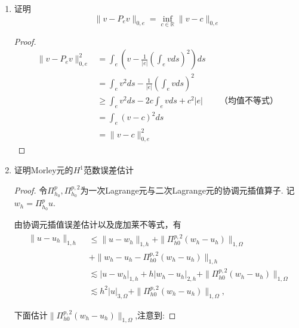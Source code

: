 \documentclass[12pt,a4paper]{article}
\begin{document}
\begin{enumerate}
\begin{proof}
			注意到最小特征值$\lambda = \frac{\pi^2}{L^2}$,进而
			
			$$\frac{\pi^2}{L^2} \|\xi\|_{0,e}^2 \leq |\xi|_{1,e}^2$$
			
		\end{proof}
		
		
		
		\item 证明
		$$\|v-P_ev\|_{0,e}=\inf_{c\in\mathbb{R}}\|v-c\|_{0,e}$$
		
		\begin{proof}
			
			$$\begin{aligned}
				\|v-P_e v\|_{0,e}^2 &= \int_e \left(v-\frac{1}{|e|}(\int_e v ds)^2\right)ds\\
				& = \int_e v^2 ds - \frac{1}{|e|}(\int_e v ds)^2\\
				& \geq \int_e v^2 ds - 2c \int_e v ds + c^2 |e| \qquad \text{（均值不等式）}\\
				& = \int_e (v-c)^2 ds\\
				& = \|v-c\|_{0,e}^2
			\end{aligned}$$
			
		\end{proof}
		
		\item 证明Morley元的$H^{1}$范数误差估计
		
		\begin{proof}
			令$\Pi_{h_0}^p,\Pi_{h_0}^{p,2}$为一次Lagrange元与二次Lagrange元的协调元插值算子. 记$w_h = \Pi_{h_0}^p u$.
			
			由协调元插值误差估计以及庞加莱不等式，有
			\begin{equation}\label{eq1}
				\begin{aligned}
					\begin{aligned}\|u-u_h\|_{1,h}\end{aligned}& \leqslant\|u-w_h\|_{1,h}+\|\Pi_{h0}^{p,2}(w_h-u_h)\|_{1,\Omega}  \\
					&+\|w_h-u_h-\Pi_{h0}^{p,2}(w_h-u_h)\|_{1,h} \\
					&\lesssim|u-w_h|_{1,h}+h|w_h-u_h|_{2,h}+\|\Pi_{h0}^{p,2}(w_h-u_h)\|_{1,\Omega} \\
					&\lesssim h^2|u|_{3,\Omega}+\|\Pi_{h0}^{p,2}(w_h-u_h)\|_{1,\Omega},
				\end{aligned}
			\end{equation}
			
			
			
			下面估计$\|\Pi_{h0}^{p,2}(w_h-u_h)\|_{1,\Omega}$,注意到:
			

\end{proof}
\end{enumerate}
\end{document}
